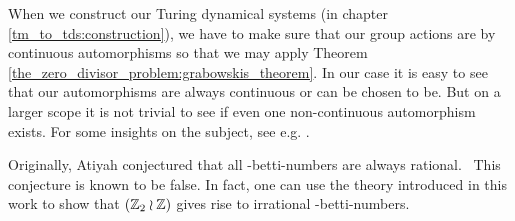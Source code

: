 \begin{Remark}
	\label{remarks:continuous_group_automorphisms}
	When we construct our Turing dynamical systems (in chapter \ref{tm_to_tds:construction}), we have to make sure that our group actions are by continuous automorphisms so that we may apply Theorem \ref{the_zero_divisor_problem:grabowskis_theorem}.
	In our case it is easy to see that our automorphisms are always continuous or can be chosen to be.
	But on a larger scope it is not trivial to see if even one non-continuous automorphism exists. For some insights on the subject, see e.g. \cite{bhk16}.
\end{Remark}

\begin{Remark}
	\label{remarks:atiyah-conjecture}
	Originally, Atiyah conjectured that all \ltwo-betti-numbers are always rational.\footnotemark~
	This conjecture is known to be false.
	In fact, one can use the theory introduced in this work to show that $(\mathbb{Z}_2 \wr \mathbb{Z})$ gives rise to irrational \ltwo-betti-numbers.
\end{Remark}
